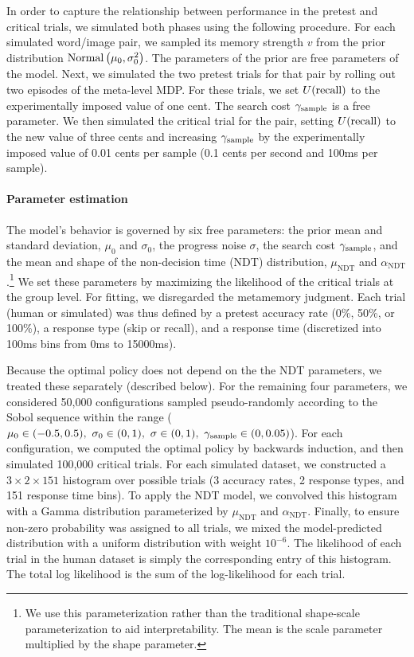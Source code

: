 In order to capture the relationship between performance in the pretest and critical trials, we simulated both phases using the following procedure. For each simulated word/image pair, we sampled its memory strength $v$ from the prior distribution $\mathrm{Normal}\left( \mu_0, \sigma_0^2 \right)$. The parameters of the prior are free parameters of the model. Next, we simulated the two pretest trials for that pair by rolling out two episodes of the meta-level MDP. For these trials, we set $U({\text{recall}})$ to the experimentally imposed value of one cent. The search cost $\gamma_\text{sample}$ is a free parameter. We then simulated the critical trial for the pair, setting $U({\text{recall}})$ to the new value of three cents and increasing $\gamma_\text{sample}$ by the experimentally imposed value of 0.01 cents per sample (0.1 cents per second and 100ms per sample).

\paragraph{Parameter estimation}

The model's behavior is governed by six free parameters: the prior mean and standard deviation, $\mu_0$ and $\sigma_0$, the progress noise $\sigma$, the search cost $\gamma_\text{sample}$, and the mean and shape of the non-decision time (NDT) distribution, $\mu_\text{NDT}$ and $\alpha_\text{NDT}$.\footnote{%
  We use this parameterization rather than the traditional shape-scale parameterization to aid interpretability. The mean is the scale parameter multiplied by the shape parameter.
} We set these parameters by maximizing the likelihood of the critical trials at the group level. For fitting, we disregarded the metamemory judgment. Each trial (human or simulated) was thus defined by a pretest accuracy rate (0\%, 50\%, or 100\%), a response type (skip or recall), and a response time (discretized into 100ms bins from 0ms to 15000ms). 

Because the optimal policy does not depend on the the NDT parameters, we treated these separately (described below). For the remaining four parameters, we considered 50,000 configurations sampled pseudo-randomly according to the Sobol sequence \citep{sobol1967distribution,bergstra2012random} within the range ($\mu_0 \in (-0.5, 0.5),\ \sigma_0 \in (0, 1),\ \sigma \in (0, 1),\ \gamma_\text{sample} \in (0, 0.05)$). For each configuration, we computed the optimal policy by backwards induction, and then simulated 100,000 critical trials. For each simulated dataset, we constructed a $3 \times 2 \times 151$ histogram over possible trials (3 accuracy rates, 2 response types, and 151 response time bins). To apply the NDT model, we convolved this histogram with a Gamma distribution parameterized by $\mu_\text{NDT}$ and $\alpha_\text{NDT}$. Finally, to ensure non-zero probability was assigned to all trials, we mixed the model-predicted distribution with a uniform distribution with weight $10^{-6}$. The likelihood of each trial in the human dataset is simply the corresponding entry of this histogram. The total log likelihood is the sum of the log-likelihood for each trial.

